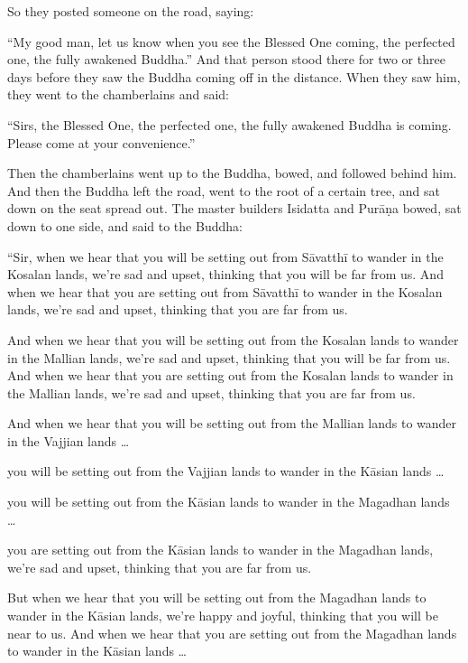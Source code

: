 \documentclass[12pt,openany]{book}%
\begin{document}
So they posted someone on the road, saying: 

“My good man, let us know when you see the Blessed One coming, the perfected one, the fully awakened Buddha.” And that person stood there for two or three days before they saw the Buddha coming off in the distance. When they saw him, they went to the chamberlains and said: 

“Sirs, the Blessed One, the perfected one, the fully awakened Buddha is coming. Please come at your convenience.” 

Then the chamberlains went up to the Buddha, bowed, and followed behind him. And then the Buddha left the road, went to the root of a certain tree, and sat down on the seat spread out. The master builders Isidatta and \textsanskrit{Purāṇa} bowed, sat down to one side, and said to the Buddha: 

“Sir, when we hear that you will be setting out from \textsanskrit{Sāvatthī} to wander in the Kosalan lands, we’re sad and upset, thinking that you will be far from us. And when we hear that you are setting out from \textsanskrit{Sāvatthī} to wander in the Kosalan lands, we’re sad and upset, thinking that you are far from us. 

And when we hear that you will be setting out from the Kosalan lands to wander in the Mallian lands, we’re sad and upset, thinking that you will be far from us. And when we hear that you are setting out from the Kosalan lands to wander in the Mallian lands, we’re sad and upset, thinking that you are far from us. 

And when we hear that you will be setting out from the Mallian lands to wander in the Vajjian lands … 

you will be setting out from the Vajjian lands to wander in the \textsanskrit{Kāsian} lands … 

you will be setting out from the \textsanskrit{Kāsian} lands to wander in the Magadhan lands … 

you are setting out from the \textsanskrit{Kāsian} lands to wander in the Magadhan lands, we’re sad and upset, thinking that you are far from us. 

But when we hear that you will be setting out from the Magadhan lands to wander in the \textsanskrit{Kāsian} lands, we’re happy and joyful, thinking that you will be near to us. And when we hear that you are setting out from the Magadhan lands to wander in the \textsanskrit{Kāsian} lands … 
\end{document}
